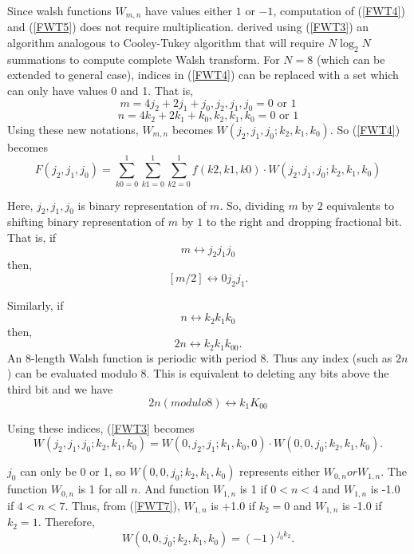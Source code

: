 Since walsh functions $W_{m,n}$ have values either $1$ or $-1$, computation of (\ref{FWT4}) and (\ref{FWT5}) does not require multiplication.
\cite{Shanks1969} derived using (\ref{FWT3}) an algorithm analogous to Cooley-Tukey algorithm that will require $N \log_2 N$ summations to compute complete Walsh transform. \linebreak
For $N = 8$ (which can be extended to general case),\linebreak
indices in (\ref{FWT4}) can be replaced with a set which can only have values 0 and 1. That is, 
\begin{equation}
\label{FWT6}
m = 4j_2 + 2j_1 + j_0, \text{$j_2, j_1, j_0 = 0$ or $1$}
\end{equation}
\begin{equation}
\label{FWT7}
n = 4k_2 + 2k_1 + k_0, \text{$k_2, k_1, k_0 = 0$ or $1$}
\end{equation}
Using these new notations, $W_{m,n}$ becomes $W(j_2,j_1,j_0;k_2,k_1,k_0)$. So (\ref{FWT4}) becomes 
\begin{equation}
\label{FWT8}
F(j_2,j_1,j_0) = \sum\limits_{k0 = 0}^1 \sum\limits_{k1 = 0}^1 \sum\limits_{k2 = 0}^1 f(k2,k1,k0) \cdot W(j_2,j_1,j_0;k_2,k_1,k_0)
\end{equation}

Here, $j_2,j_1,j_0$ is binary representation of $m$. So, dividing $m$ by $2$ equivalents to shifting binary representation of $m$ by $1$ to the right and dropping fractional bit. That is, if 
\[
m \leftrightarrow j_2j_1j_0
\]
then,
\[
[m/2] \leftrightarrow 0j_2j_1.
\]

Similarly, if
\[
n \leftrightarrow k_2k_1k_0
\]
then,
\[
2n \leftrightarrow k_2k_1k_00.
\]
An 8-length Walsh function is periodic with period 8. Thus any index (such as $2n$) can be evaluated modulo 8. This is equivalent to deleting any bits above the third bit and we have 
\[
2n(modulo 8) \leftrightarrow k_1K_00
\]

Using these indices, (\ref{FWT3} becomes
\begin{equation}
\label{FWT9}
W(j_2,j_1,j_0;k_2,k_1,k_0) = W(0,j_2,j_1;k_1,k_0,0) \cdot W(0,0,j_0;k_2,k_1,k_0).
\end{equation}

$j_0$ can only be 0 or 1, so $W(0,0,j_0; k_2, k_1, k_0)$ represents either $W_{0,n} or W_{1,n}$. The function $W_{0,n}$ is 1 for all $n$. And function $W_{1,n}$ is 1 if $0<n<4$ and $W_{1,n}$ is -1.0 if $4<n<7$. Thus, from (\ref{FWT7}), $W_{1,n}$ is +1.0 if $k_2=0$ and $W_{1,n}$ is -1.0 if $k_2 = 1$. Therefore, 
\begin{equation}
\label{FWT10}
W(0,0,j_0;k_2,k_1,k_0) = (-1)^{j_0k_2}.
\end{equation}

